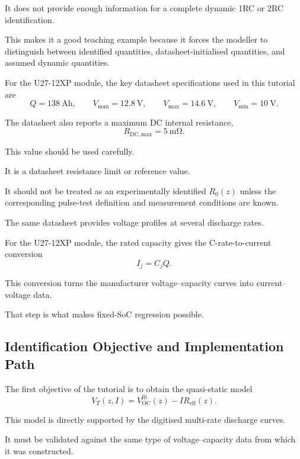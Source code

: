 \documentclass[a4paper,12pt]{article}
\begin{document}
It does not provide enough information for a complete dynamic 1RC or 2RC identification.

This makes it a good teaching example because it forces the modeller to distinguish between identified quantities, datasheet-initialised quantities, and assumed dynamic quantities.

For the U27-12XP module, the key datasheet specifications used in this tutorial are
\[
    Q = \SI{138}{\ampere\hour},
    \qquad
    V_{\mathrm{nom}} = \SI{12.8}{\volt},
    \qquad
    V_{\max} = \SI{14.6}{\volt},
    \qquad
    V_{\min} = \SI{10}{\volt}.
\]

The datasheet also reports a maximum DC internal resistance,
\[
    R_{\mathrm{DC,max}} = \SI{5}{\milli\ohm}.
\]

This value should be used carefully.

It is a datasheet resistance limit or reference value.

It should not be treated as an experimentally identified \(R_0(z)\) unless the corresponding pulse-test definition and measurement conditions are known.

The same datasheet provides voltage profiles at several discharge rates.

For the U27-12XP module, the rated capacity gives the C-rate-to-current conversion
\begin{equation}
I_j
=
C_j Q.
\label{eq:crate_current_general_intro}
\end{equation}

This conversion turns the manufacturer voltage--capacity curves into current--voltage data.

That step is what makes fixed-SoC regression possible.

\subsection{Identification Objective and Implementation Path}

The first objective of the tutorial is to obtain the quasi-static model
\begin{equation}
\boxed{
V_T(z,I)
=
V_{\mathrm{OC}}^{\mathrm{fit}}(z)
-
I R_{\mathrm{eff}}(z).
}
\label{eq:section1_static_output}
\end{equation}

This model is directly supported by the digitised multi-rate discharge curves.

It must be validated against the same type of voltage--capacity data from which it was constructed.
\end{document}
